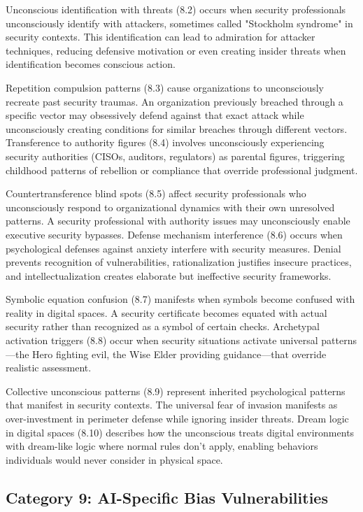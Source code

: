 \documentclass[11pt,a4paper]{article}
\begin{document}
Unconscious identification with threats (8.2) occurs when security professionals unconsciously identify with attackers, sometimes called "Stockholm syndrome" in security contexts. This identification can lead to admiration for attacker techniques, reducing defensive motivation or even creating insider threats when identification becomes conscious action.

Repetition compulsion patterns (8.3) cause organizations to unconsciously recreate past security traumas. An organization previously breached through a specific vector may obsessively defend against that exact attack while unconsciously creating conditions for similar breaches through different vectors. Transference to authority figures (8.4) involves unconsciously experiencing security authorities (CISOs, auditors, regulators) as parental figures, triggering childhood patterns of rebellion or compliance that override professional judgment.

Countertransference blind spots (8.5) affect security professionals who unconsciously respond to organizational dynamics with their own unresolved patterns. A security professional with authority issues may unconsciously enable executive security bypasses. Defense mechanism interference (8.6) occurs when psychological defenses against anxiety interfere with security measures. Denial prevents recognition of vulnerabilities, rationalization justifies insecure practices, and intellectualization creates elaborate but ineffective security frameworks.

Symbolic equation confusion (8.7) manifests when symbols become confused with reality in digital spaces. A security certificate becomes equated with actual security rather than recognized as a symbol of certain checks. Archetypal activation triggers (8.8) occur when security situations activate universal patterns—the Hero fighting evil, the Wise Elder providing guidance—that override realistic assessment.

Collective unconscious patterns (8.9) represent inherited psychological patterns that manifest in security contexts. The universal fear of invasion manifests as over-investment in perimeter defense while ignoring insider threats. Dream logic in digital spaces (8.10) describes how the unconscious treats digital environments with dream-like logic where normal rules don't apply, enabling behaviors individuals would never consider in physical space.

\subsection{Category 9: AI-Specific Bias Vulnerabilities}
\end{document}
